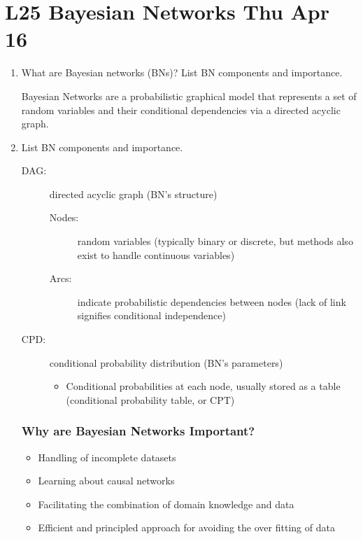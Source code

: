 \documentclass[12pt]{article}
\newenvironment{QandA}{\begin{enumerate}[label=\bfseries\arabic*.]\bfseries}
{\end{enumerate}}
\newenvironment{answered}{\par\normalfont\color{Sepia}}{}
\begin{document}
\section*{L25 Bayesian Networks \textemdash{} Thu Apr 16}
\begin{QandA}
    \item What are Bayesian networks (BNs)? List BN components and importance.
    \begin{answered}
        Bayesian Networks are a probabilistic graphical model that represents 
        a set of random variables and their conditional dependencies via a 
        directed acyclic graph.
    \end{answered}

    \item List BN components and importance.
    \begin{answered}
        \begin{description}
            \item[DAG:] directed acyclic graph (BN’s structure)
            \begin{description}
                \item[Nodes:] random variables (typically binary or discrete, but methods also exist to handle continuous variables)
                \item[Arcs:] indicate probabilistic dependencies between nodes (lack of link signifies conditional independence)
            \end{description}
             
            \item[CPD:] conditional probability distribution (BN’s parameters)
            \begin{itemize}
                \item Conditional probabilities at each node, usually stored as a table (conditional probability table, or CPT)
            \end{itemize} 
        \end{description}
    
        \subsubsection*{Why are Bayesian Networks Important?}
        \begin{itemize}
            \item Handling of incomplete datasets
            \item Learning about causal networks
            \item Facilitating the combination of domain knowledge and data
            \item Efficient and principled approach for avoiding the over fitting of data
        \end{itemize}
    \end{answered}


\end{QandA}
\end{document}
